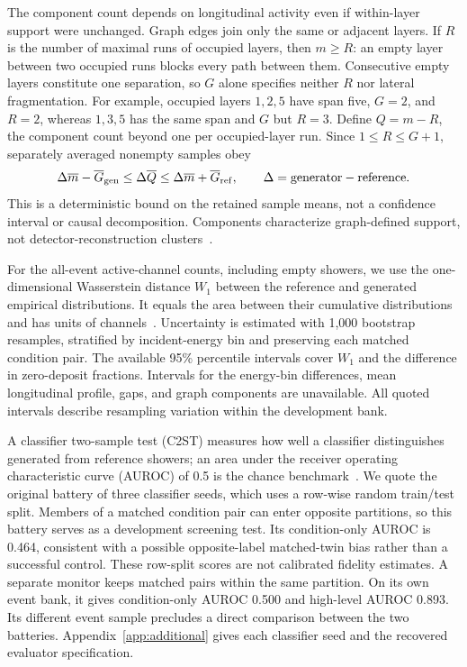 \documentclass[11pt]{article}
\begin{document}
The component count depends on longitudinal activity even if within-layer support were unchanged. Graph edges join only the same or adjacent layers. If $R$ is the number of maximal runs of occupied layers, then $m\geq R$: an empty layer between two occupied runs blocks every path between them. Consecutive empty layers constitute one separation, so $G$ alone specifies neither $R$ nor lateral fragmentation. For example, occupied layers $1,2,5$ have span five, $G=2$, and $R=2$, whereas $1,3,5$ has the same span and $G$ but $R=3$. Define $Q=m-R$, the component count beyond one per occupied-layer run. Since $1\leq R\leq G+1$, separately averaged nonempty samples obey
\[
 \Delta\overline m-\overline G_{\rm gen}\leq\Delta\overline Q
 \leq\Delta\overline m+\overline G_{\rm ref},
 \qquad \Delta=\mathrm{generator}-\mathrm{reference}.
\]
This is a deterministic bound on the retained sample means, not a confidence interval or causal decomposition. Components characterize graph-defined support, not detector-reconstruction clusters~\cite{atlastopocluster}.

For the all-event active-channel counts, including empty showers, we use the one-dimensional Wasserstein distance $W_1$ between the reference and generated empirical distributions. It equals the area between their cumulative distributions and has units of channels~\cite{kansalmetrics}. Uncertainty is estimated with 1,000 bootstrap resamples, stratified by incident-energy bin and preserving each matched condition pair. The available 95\% percentile intervals cover $W_1$ and the difference in zero-deposit fractions. Intervals for the energy-bin differences, mean longitudinal profile, gaps, and graph components are unavailable. All quoted intervals describe resampling variation within the development bank.

A classifier two-sample test (C2ST) measures how well a classifier distinguishes generated from reference showers; an area under the receiver operating characteristic curve (AUROC) of 0.5 is the chance benchmark~\cite{c2st,kansalmetrics}. We quote the original battery of three classifier seeds, which uses a row-wise random train/test split. Members of a matched condition pair can enter opposite partitions, so this battery serves as a development screening test. Its condition-only AUROC is 0.464, consistent with a possible opposite-label matched-twin bias rather than a successful control. These row-split scores are not calibrated fidelity estimates. A separate monitor keeps matched pairs within the same partition. On its own event bank, it gives condition-only AUROC 0.500 and high-level AUROC 0.893. Its different event sample precludes a direct comparison between the two batteries. Appendix~\ref{app:additional} gives each classifier seed and the recovered evaluator specification.
\end{document}
